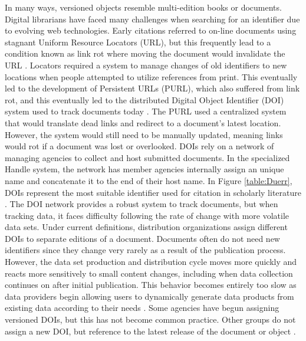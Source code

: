 In many ways, versioned objects resemble multi-edition books or documents.
Digital librarians have faced many challenges when searching for an identifier due to evolving web technologies.
Early citations referred to on-line documents using stagnant Uniform Resource Locators (URL), but this frequently lead to a condition known as link rot where moving the document would invalidate the URL \cite{Lyons2005}.
Locators required a system to manage changes of old identifiers to new locations when people attempted to utilize references from print.
This eventually led to the development of Persistent URLs (PURL), which also suffered from link rot, and this eventually led to the distributed Digital Object Identifier (DOI) system used to track documents today \cite{Duerr2011}.
The PURL used a centralized system that would translate dead links and redirect to a document's latest location.
However, the system would still need to be manually updated, meaning links would rot if a document was lost or overlooked.
DOIs rely on a network of managing agencies to collect and host submitted documents.
In the specialized Handle system, the network has member agencies internally assign an unique name and concatenate it to the end of their host name.
In Figure \ref{table:Duerr}, DOIs represent the most suitable identifier used for citation in scholarly literature \cite{Duerr2011}.
The DOI network provides a robust system to track documents, but when tracking data, it faces difficulty following the rate of change with more volatile data sets.
Under current definitions, distribution organizations assign different DOIs to separate editions of a document.
Documents often do not need new identifiers since they change very rarely as a result of the publication process.
However, the data set production and distribution cycle moves more quickly and reacts more sensitively to small content changes, including when data collection continues on after initial publication.
This behavior becomes entirely too slow as data providers begin allowing users to dynamically generate data products from existing data according to their needs \cite{Barkstrom2003a}.
Some agencies have begun assigning versioned DOIs, but this has not become common practice.
Other groups do not assign a new DOI, but reference to the latest release of the document or object \cite{Ands2017}.

